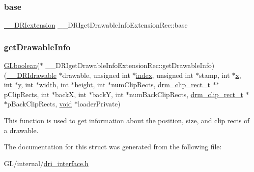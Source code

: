 \subsubsection{\texorpdfstring{base}{base}}
{\footnotesize\ttfamily \hyperlink{dri__interface_8h_a4e0a61c8ece00d2b2c6792a9a1b55385}{\+\_\+\+\_\+\+D\+R\+Iextension} \+\_\+\+\_\+\+D\+R\+Iget\+Drawable\+Info\+Extension\+Rec\+::base}

\mbox{\label{struct_____d_r_iget_drawable_info_extension_rec_a891881ca6122407756c37d8ac5f8075c}} 
\subsubsection{\texorpdfstring{get\+Drawable\+Info}{getDrawableInfo}}
{\footnotesize\ttfamily \hyperlink{gl_8h_aea1419aa8aec5854bd9807b45171029d}{G\+Lboolean}($\ast$  \+\_\+\+\_\+\+D\+R\+Iget\+Drawable\+Info\+Extension\+Rec\+::get\+Drawable\+Info) (\hyperlink{dri__interface_8h_a5bfb832a0a08208d95b3bbef439d2262}{\+\_\+\+\_\+\+D\+R\+Idrawable} $\ast$drawable, unsigned int $\ast$\hyperlink{glcorearb_8h_a57f14e05b1900f16a2da82ade47d0c6d}{index}, unsigned int $\ast$stamp, int $\ast$\hyperlink{gl_8h_ad0e63d0edcdbd3d79554076bf309fd47}{x}, int $\ast$\hyperlink{gl_8h_a1675d9d7bb68e1657ff028643b4037e3}{y}, int $\ast$\hyperlink{gl_8h_a9a82cf3caff84cabc4598e2619faac17}{width}, int $\ast$\hyperlink{gl_8h_aa352f2804b9902ac30769c00dde75d5f}{height}, int $\ast$num\+Clip\+Rects, \hyperlink{dri__interface_8h_a912a372f2417e4f139f82bbf0a3d4fc1}{drm\+\_\+clip\+\_\+rect\+\_\+t} $\ast$$\ast$p\+Clip\+Rects, int $\ast$backX, int $\ast$backY, int $\ast$num\+Back\+Clip\+Rects, \hyperlink{dri__interface_8h_a912a372f2417e4f139f82bbf0a3d4fc1}{drm\+\_\+clip\+\_\+rect\+\_\+t} $\ast$$\ast$p\+Back\+Clip\+Rects, \hyperlink{_s_d_l__opengles2__gl2ext_8h_ae5d8fa23ad07c48bb609509eae494c95}{void} $\ast$loader\+Private)}

This function is used to get information about the position, size, and clip rects of a drawable. 

The documentation for this struct was generated from the following file\+:\begin{DoxyCompactItemize}
\item 
G\+L/internal/\hyperlink{dri__interface_8h}{dri\+\_\+interface.\+h}\end{DoxyCompactItemize}
